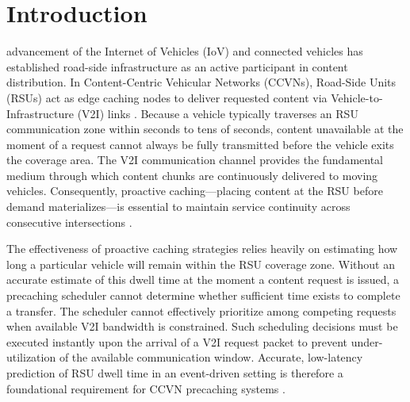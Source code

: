 \documentclass[journal]{IEEEtran}
\begin{document}
\IEEEpeerreviewmaketitle


\section{Introduction}\label{sec:introduction}

 advancement of the Internet of Vehicles (IoV) and connected vehicles has established road-side infrastructure as an active participant in content distribution.
In Content-Centric Vehicular Networks (CCVNs), Road-Side Units (RSUs) act as edge caching nodes to deliver requested content via Vehicle-to-Infrastructure (V2I) links \cite{1,3,45}.
Because a vehicle typically traverses an RSU communication zone within seconds to tens of seconds, content unavailable at the moment of a request cannot always be fully transmitted before the vehicle exits the coverage area.
The V2I communication channel provides the fundamental medium through which content chunks are continuously delivered to moving vehicles.
Consequently, proactive caching---placing content at the RSU before demand materializes---is essential to maintain service continuity across consecutive intersections \cite{32,33,39}.

The effectiveness of proactive caching strategies relies heavily on estimating how long a particular vehicle will remain within the RSU coverage zone.
Without an accurate estimate of this dwell time at the moment a content request is issued, a precaching scheduler cannot determine whether sufficient time exists to complete a transfer.
The scheduler cannot effectively prioritize among competing requests when available V2I bandwidth is constrained.
Such scheduling decisions must be executed instantly upon the arrival of a V2I request packet to prevent under-utilization of the available communication window.
Accurate, low-latency prediction of RSU dwell time in an event-driven setting is therefore a foundational requirement for CCVN precaching systems \cite{42,51}.
\end{document}
